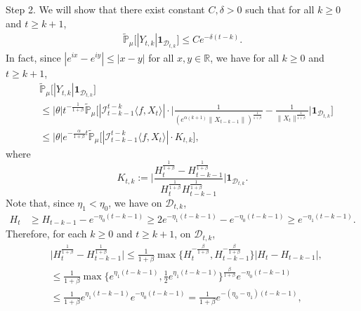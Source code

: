 \documentclass[12pt,a4paper]{amsart}
\theoremstyle{plain}
\theoremstyle{definition}
\numberwithin{equation}{section}
\begin{document}
    Step 2. We will show that there exist constant $C,\delta > 0$ such that for all $k\geq 0$ and $t\geq k+1$,
\begin{equation}\begin{split}
\label{thm122}
    \mathbb{\tilde{P}}_{\mu}\big[|Y_{t,k}|\mathbf{1}_{\mathcal{D}_{t,k}}\big]
    \leq  C e^{-\delta (t-k)}.
\end{split}\end{equation}
    In fact, since $|e^{ix}-e^{iy}|\leq|x-y|$ for all $x,y\in \mathbb R$, we have for all $k \geq 0$ and $t\geq k+1$,
\begin{equation}\begin{split}
\label{eq: control of Ykt}
    &\mathbb{\tilde{P}}_{\mu}\big[|Y_{t,k}|\mathbf{1}_{\mathcal{D}_{t,k}}\big]
    \\&\leq|\theta|t^{-\frac{1}{1+\beta}} \mathbb{\tilde{P}}_{\mu}\bigg[|\mathcal I_{t-k-1}^{t-k}\langle f ,X_t\rangle|\cdot\Big|\frac{1}{(e^{\alpha(k+1)}\|X_{t-k-1}\|)^{\frac{1}{1+\beta}}}-\frac{1}{\|X_t\|^{\frac{1}{1+\beta}}}\Big|\mathbf{1}_{\mathcal{D}_{t,k}}\bigg]
    \\&\leq |\theta| e^{-\frac{\alpha}{1+\beta}t}\mathbb{\tilde{P}}_{\mu}\big[|\mathcal I_{t-k-1}^{t-k}\langle f ,X_t\rangle|\cdot K_{t,k}\big],
\end{split}\end{equation}
    where
\begin{equation}
\label{def: Ktk}
    K_{t,k}
    :=\Big|\frac{H_t^{\frac{1}{1+\beta}}-H_{t-k-1}^{\frac{1}{1+\beta}}}{H_t^{\frac{1}{1+\beta}}H_{t-k-1}^{\frac{1}{1+\beta}}}\Big|\mathbf{1}_{\mathcal{D}_{t,k}}.
\end{equation}
    Note that, since $\eta_1 < \eta_0$, we have on $\mathcal D_{t,k}$, 
\begin{align*}
    H_t
    &\geq H_{t-k-1}- e^{-\eta_0(t-k-1)}
    \geq 2e^{-\eta_1(t-k-1)}-e^{-\eta_0(t-k-1)}
    \geq e^{-\eta_1(t-k-1)}.
\end{align*}
    Therefore, for each $k \geq 0$ and $t\geq k+1$,  on $\mathcal D_{t,k}$, 
\begin{align*}
    &\Big|H_t^{\frac{1}{1+\beta}}-H_{t-k-1}^{\frac{1}{1+\beta}}\Big|
    \leq \frac{1}{1+\beta}\max \Big\{H_t^{-\frac{\beta}{1+\beta}},H_{t-k-1}^{-\frac{\beta}{1+\beta}}\Big\}\left|H_t-H_{t-k-1}\right|,
    \\&\leq \frac{1}{1+\beta} \max\{e^{\eta_1 (t-k-1)}, \frac{1}{2}e^{\eta_1(t-k-1)}\}^{\frac{\beta}{1+\beta}}e^{-\eta_0(t-k-1)}
    \\&\leq \frac{1}{1+\beta} e^{\eta_1 (t-k-1)} e^{-\eta_0(t-k-1)}
    =\frac{1}{1+\beta}  e^{-(\eta_0 - \eta_1)(t-k-1)},
\end{align*}
\end{document}
